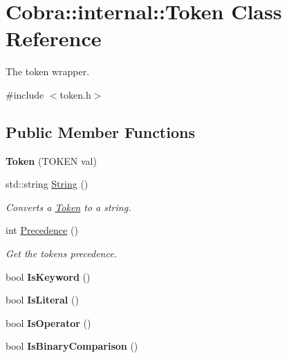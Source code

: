 \hypertarget{class_cobra_1_1internal_1_1_token}{\section{Cobra\+:\+:internal\+:\+:Token Class Reference}
\label{class_cobra_1_1internal_1_1_token}
}


The token wrapper.  




{\ttfamily \#include $<$token.\+h$>$}

\subsection*{Public Member Functions}
\begin{DoxyCompactItemize}
\item 
\hypertarget{class_cobra_1_1internal_1_1_token_a1e990f5ae45f5c16bba6fa40915b8f85}{{\bfseries Token} (T\+O\+K\+E\+N val)}\label{class_cobra_1_1internal_1_1_token_a1e990f5ae45f5c16bba6fa40915b8f85}

\item 
std\+::string \hyperlink{class_cobra_1_1internal_1_1_token_a9b435c68c2bfc19212e2dc5f78d432e9}{String} ()
\begin{DoxyCompactList}\small\item\em Converts a \hyperlink{class_cobra_1_1internal_1_1_token}{Token} to a string. \end{DoxyCompactList}\item 
int \hyperlink{class_cobra_1_1internal_1_1_token_a7ecee93c532317ef454004e21acab296}{Precedence} ()
\begin{DoxyCompactList}\small\item\em Get the tokens precedence. \end{DoxyCompactList}\item 
\hypertarget{class_cobra_1_1internal_1_1_token_a8e785fd925b773ee2d53d62bcbb5a0c5}{bool {\bfseries Is\+Keyword} ()}\label{class_cobra_1_1internal_1_1_token_a8e785fd925b773ee2d53d62bcbb5a0c5}

\item 
\hypertarget{class_cobra_1_1internal_1_1_token_a8a89dbcd9e6df18c9141e4d3e3a86c93}{bool {\bfseries Is\+Literal} ()}\label{class_cobra_1_1internal_1_1_token_a8a89dbcd9e6df18c9141e4d3e3a86c93}

\item 
\hypertarget{class_cobra_1_1internal_1_1_token_a3d421adb48da3d0fd768e3b8448a1bd9}{bool {\bfseries Is\+Operator} ()}\label{class_cobra_1_1internal_1_1_token_a3d421adb48da3d0fd768e3b8448a1bd9}

\item 
\hypertarget{class_cobra_1_1internal_1_1_token_a70a15870b5bb24e8d162b09622a5884e}{bool {\bfseries Is\+Binary\+Comparison} ()}\label{class_cobra_1_1internal_1_1_token_a70a15870b5bb24e8d162b09622a5884e}

\end{DoxyCompactItemize}
